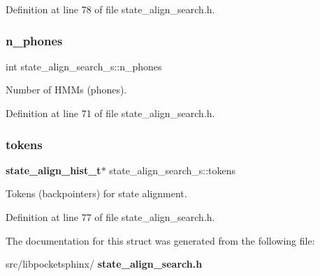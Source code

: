 Definition at line 78 of file state\+\_\+align\+\_\+search.\+h.

\mbox{\label{structstate__align__search__s_ab248827613cdbc892e35e57d5c43c7c3}} 
\subsubsection{n\+\_\+phones}
{\footnotesize\ttfamily int state\+\_\+align\+\_\+search\+\_\+s\+::n\+\_\+phones}



Number of H\+M\+Ms (phones). 



Definition at line 71 of file state\+\_\+align\+\_\+search.\+h.

\mbox{\label{structstate__align__search__s_a2fae207533462fe6efe19c8a2a3a64e0}} 
\subsubsection{tokens}
{\footnotesize\ttfamily \textbf{ state\+\_\+align\+\_\+hist\+\_\+t}$\ast$ state\+\_\+align\+\_\+search\+\_\+s\+::tokens}



Tokens (backpointers) for state alignment. 



Definition at line 77 of file state\+\_\+align\+\_\+search.\+h.



The documentation for this struct was generated from the following file\+:\begin{DoxyCompactItemize}
\item 
src/libpocketsphinx/\textbf{ state\+\_\+align\+\_\+search.\+h}\end{DoxyCompactItemize}
